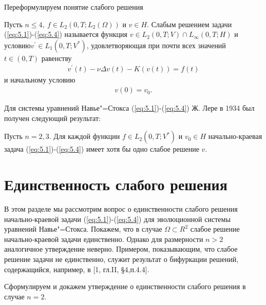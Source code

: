 Переформулируем понятие слабого решения
\begin{definition}
    Пусть $n \le 4, \ f \in L_2(0, T; L_2(\Omega))$ и $v \in H$. Слабым решением задачи (\ref{eq:5.1})-(\ref{eq:5.4}) называется функция
    $v \in L_2(0, T; V)\cap L_{\infty}(0,T;H)$ и условию$ v^{\prime}\in L_1(0, T; V^\ast)$, удовлетворяющая при почти всех значений $t \in (0, T)$ равенству 
    \begin{equation}\label{eq:5.11}
        \begin{gathered}
            v^\prime(t) - \nu\Delta v(t) - K(v(t)) = f(t)
        \end{gathered}
    \end{equation}
      и начальному условию
    \begin{equation}\label{eq:5.12}
        \begin{gathered}
            v(0) = v_0.
        \end{gathered}
    \end{equation}
\end{definition}
Для системы уравнений Навье"=Стокса (\ref{eq:5.1})-(\ref{eq:5.4}) Ж. Лере в 1934 был получен следующий результат:
\begin{theorem}
Пусть $n=2,3$. Для каждой функции $f\in L_2(0,T;V^\ast)$ и $v_0\in H$ начально-краевая задача (\ref{eq:5.1})-(\ref{eq:5.4})
имеет хотя бы одно слабое решение $v.$
\end{theorem}
\clearpage

\section {Единственность слабого решения }
В этом разделе мы рассмотрим вопрос о единственности слабого решения начально-краевой задачи (\ref{eq:5.1})-(\ref{eq:5.4}) для эволюционной
системы уравнений Навье"=Стокса. Покажем, что в случае $\Omega \subset R^2$ слабое решение начально-краевой задачи единственно.
Однако для размерности $n > 2$ аналогичное утверждение неверно. Примером, показывающим, что слабое решение задачи не единственно, служит результат
о бифуркации решений, содержащийся, например, в [1, гл.II, \S 4,п.4.4].

Сформулируем и докажем утверждение о единственности слабого решения в случае $n = 2$.

